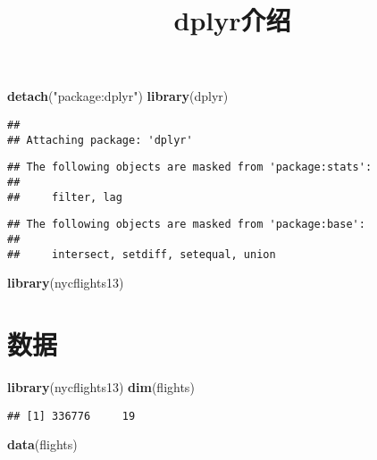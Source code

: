 \documentclass[
]{article}
\title{dplyr介绍}
\author{}
\date{\vspace{-2.5em}}
\newenvironment{Shaded}{\begin{snugshade}}{\end{snugshade}}
\newcommand{\KeywordTok}[1]{\textcolor[rgb]{0.13,0.29,0.53}{\textbf{#1}}}
\newcommand{\NormalTok}[1]{#1}
\newcommand{\StringTok}[1]{\textcolor[rgb]{0.31,0.60,0.02}{#1}}
\begin{document}
\maketitle

\begin{Shaded}
\begin{Highlighting}[]
\KeywordTok{detach}\NormalTok{(}\StringTok{"package:dplyr"}\NormalTok{)}
\KeywordTok{library}\NormalTok{(dplyr)}
\end{Highlighting}
\end{Shaded}

\begin{verbatim}
## 
## Attaching package: 'dplyr'
\end{verbatim}

\begin{verbatim}
## The following objects are masked from 'package:stats':
## 
##     filter, lag
\end{verbatim}

\begin{verbatim}
## The following objects are masked from 'package:base':
## 
##     intersect, setdiff, setequal, union
\end{verbatim}

\begin{Shaded}
\begin{Highlighting}[]
\KeywordTok{library}\NormalTok{(nycflights13)}
\end{Highlighting}
\end{Shaded}

\hypertarget{ux6570ux636e}{%
\section{数据}\label{ux6570ux636e}}

\begin{Shaded}
\begin{Highlighting}[]
\KeywordTok{library}\NormalTok{(nycflights13)}
\KeywordTok{dim}\NormalTok{(flights)}
\end{Highlighting}
\end{Shaded}

\begin{verbatim}
## [1] 336776     19
\end{verbatim}

\begin{Shaded}
\begin{Highlighting}[]
\KeywordTok{data}\NormalTok{(flights)}
\end{Highlighting}
\end{Shaded}
\end{document}
